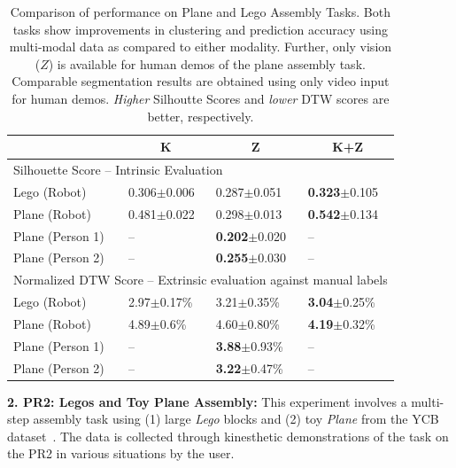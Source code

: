\documentclass[0-main.tex]{subfiles}
\begin{document}
\begin{table}[t!]
\centering
\caption{Comparison of \TSC performance on Plane and Lego Assembly Tasks. Both tasks show improvements in clustering and prediction accuracy using multi-modal data as compared to either modality. Further, only vision ($Z$) is available for human demos of the plane assembly task. Comparable segmentation results are obtained using only video input for human demos. \textit{Higher} Silhoutte Scores and \textit{lower} DTW scores are better, respectively. \label{tab:pr2}}
\vspace{-5pt}
\begin{tabular}{l|l|l|l}
\hline
\multicolumn{1}{c|}{}& \multicolumn{1}{c|}{K} & \multicolumn{1}{c|}{Z} & \multicolumn{1}{c}{K+Z} \\ \hline \hline 
\multicolumn{4}{l}{\cellcolor[HTML]{CBCEFB}Silhouette Score -- Intrinsic Evaluation}  \\
Lego (Robot)    & 0.306$\pm$0.006 & 0.287$\pm$0.051 & \textbf{0.323}$\pm$0.105  \\
\rowcolor[HTML]{E0E0E0}
 Plane (Robot)   & 0.481$\pm$0.022 & 0.298$\pm$0.013    & \textbf{0.542}$\pm$0.134 \\
Plane (Person 1) & -- & \textbf{0.202}$\pm$0.020  & -- \\ 
\rowcolor[HTML]{E0E0E0}
Plane (Person 2) & -- & \textbf{0.255}$\pm$0.030  & -- \\ \hline \hline
\multicolumn{4}{l}{\cellcolor[HTML]{FFC72C}Normalized DTW Score -- Extrinsic evaluation against manual labels}  \\ 
Lego (Robot)    & 2.97$\pm$0.17\%  & 3.21$\pm$0.35\%  & \textbf{3.04}$\pm$0.25\%  \\
\rowcolor[HTML]{E0E0E0}
 Plane (Robot)   & 4.89$\pm$0.6\%   & 4.60$\pm$0.80\%  & \textbf{4.19}$\pm$0.32\%    \\ 
Plane (Person 1) & -- & \textbf{3.88}$\pm$0.93\%  & -- \\ 
\rowcolor[HTML]{E0E0E0}
Plane (Person 2) & -- & \textbf{3.22}$\pm$0.47\%  & -- \\ \hline
\end{tabular} 
\vspace{-15pt}
\end{table}


\vspace{5pt}
\noindent \textbf{2. PR2: Legos and Toy Plane Assembly: }
This experiment involves a multi-step assembly task using (1) large \textit{Lego} blocks and (2) toy \textit{Plane} from the YCB dataset~\cite{calli2015corr}. The data is collected through kinesthetic demonstrations of the task on the PR2 in various situations by the user. 
\end{document}
